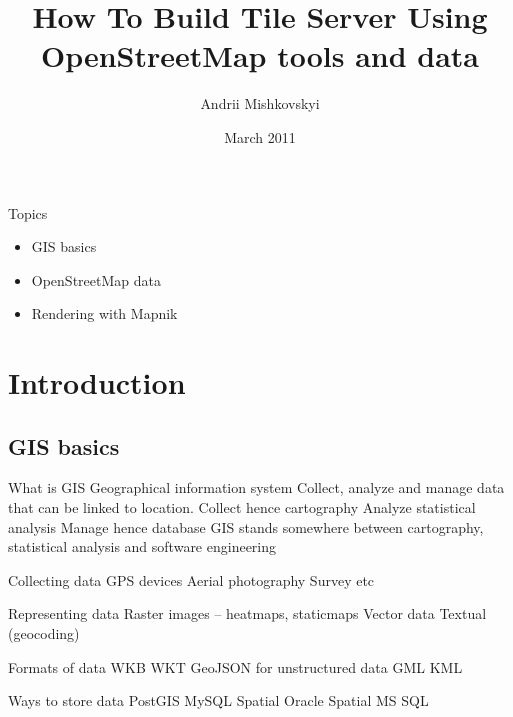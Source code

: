 \documentclass{beamer}
\begin{document}
\title{How To Build Tile Server Using OpenStreetMap tools and data}
\author{Andrii Mishkovskyi}
\date{March 2011}

\maketitle

\begin{frame}{Topics}
  \begin{itemize}
  \item GIS basics
  \item OpenStreetMap data
  \item Rendering with Mapnik
  \end{itemize}
\end{frame}

\section{Introduction}

\subsection{GIS basics}

\begin{frame}{What is GIS}
  Geographical information system
  Collect, analyze and manage data that can be linked to location.
  Collect hence cartography
  Analyze statistical analysis
  Manage hence database
  GIS stands somewhere between cartography, statistical analysis and software engineering
\end{frame}

\begin{frame}{Collecting data}
  GPS devices
  Aerial photography
  Survey
  etc
\end{frame}

\begin{frame}{Representing data}
  Raster images -- heatmaps, staticmaps
  Vector data
  Textual (geocoding)
\end{frame}

\begin{frame}{Formats of data}
  WKB
  WKT
  GeoJSON for unstructured data
  GML
  KML
\end{frame}

\begin{frame}{Ways to store data}
  PostGIS
  MySQL Spatial
  Oracle Spatial
  MS SQL
\end{frame}
\end{document}
